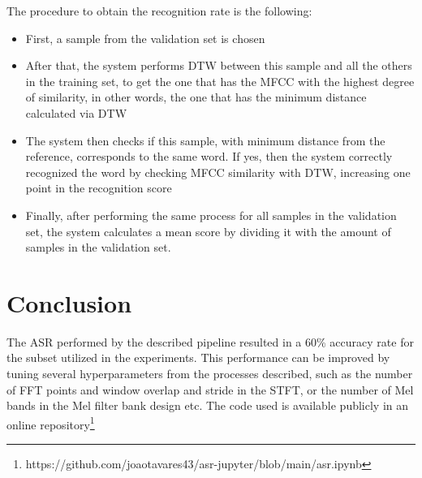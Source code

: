 \documentclass[conference]{IEEEtran}
\begin{document}
The procedure to obtain the recognition rate is the following:

\begin{itemize}
    \item First, a sample from the validation set is chosen
    \item After that, the system performs \ac{DTW} between this sample
and all the others in the training set, to get the one that has the 
\ac{MFCC} with the highest degree of similarity, in other words, the one that has the minimum
distance calculated via \ac{DTW}
    \item The system then checks if this sample, with minimum distance from the reference, 
    corresponds to the same word. If yes, then the system correctly recognized the word by 
    checking \ac{MFCC} similarity with \ac{DTW}, increasing one point in the recognition score
    \item Finally, after performing the same process for all samples in the validation set, the system
    calculates a mean score by dividing it with the amount of samples in the validation set. 
\end{itemize}

\section{Conclusion}
The \ac{ASR} performed by the described pipeline resulted in a 60\% accuracy rate for the subset utilized
in the experiments. This performance can be improved by tuning several hyperparameters from the processes
described, such as the number of FFT points and window overlap and stride in the \ac{STFT}, or the number
of Mel bands in the Mel filter bank design etc. The code used is available 
publicly in an online repository\footnote{https://github.com/joaotavares43/asr-jupyter/blob/main/asr.ipynb}




\end{document}

